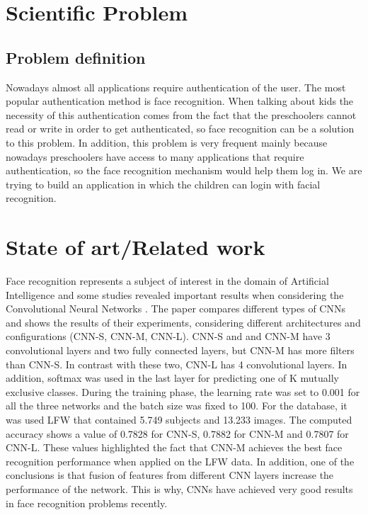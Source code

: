 \documentclass[runningheads,a4paper,11pt]{report}
\begin{document}
    \chapter{Scientific Problem}
    \label{section:scientificProblem}


    \section{Problem definition}
    \label{section:problemDefinition}
    Nowadays almost all applications require authentication of the user. The most popular authentication method is face recognition. When talking about kids the necessity of this authentication comes from the fact that the preschoolers cannot read or write in order to get authenticated, so face recognition can be a solution to this problem. In addition, this problem is very frequent mainly because nowadays preschoolers have access to many applications that require authentication, so the face recognition mechanism would help them log in.
    We are trying to build an application in which the children can login with facial recognition.



    \chapter{State of art/Related work}
    \label{chapter:stateOfArt}

    Face recognition represents a subject of interest in the domain of Artificial Intelligence and some studies revealed important results when considering the Convolutional Neural Networks \cite{hu2015face}. The paper compares different types of CNNs and shows the results of their experiments, considering different architectures and configurations (CNN-S, CNN-M, CNN-L). CNN-S and and CNN-M have 3 convolutional layers and two fully connected layers, but CNN-M has more filters than CNN-S. In contrast with these two, CNN-L has 4 convolutional layers. In addition, softmax was used in the last layer for predicting one of K mutually exclusive classes. During the training phase, the learning rate was set to 0.001 for all the three networks and the batch size was fixed to 100. For the database, it was used LFW that contained 5.749 subjects and 13.233 images. The computed accuracy shows a value of 0.7828 for CNN-S, 0.7882 for CNN-M and 0.7807 for CNN-L. These values highlighted the fact that CNN-M achieves the best face recognition performance when applied on the LFW data. In addition, one of the conclusions is that fusion of features from different CNN layers increase the performance of the network. This is why, CNNs have achieved very good results in face recognition problems recently.
\end{document}
